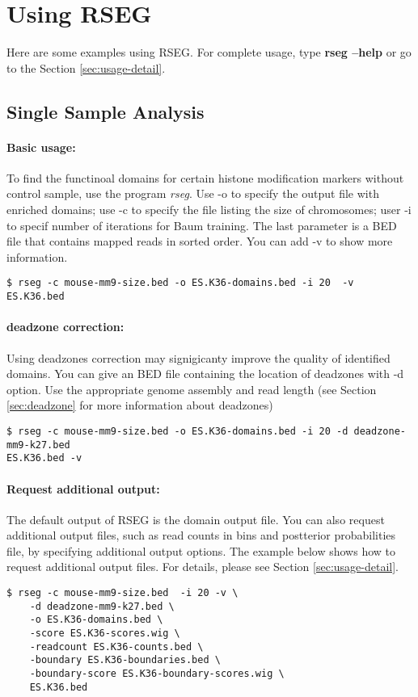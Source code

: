 \documentclass[11pt]{report}
\begin{document}
\section{Using RSEG}
\label{sec:usage}

Here are some examples using RSEG. For complete usage, type \textbf{rseg
 --help} or go to the Section \ref{sec:usage-detail}.

\subsection{Single Sample Analysis}
\label{sec:use-rseg}

\paragraph{Basic usage:} 
To find the functinoal domains for certain histone modification markers without
control sample, use the program \textit{rseg}. Use -o to specify the output file
with enriched domains; use -c to specify the file listing the size of
chromosomes; user -i to specif number of iterations for Baum training. The last
parameter is a BED file that contains mapped reads in sorted order. You can add
-v to show more information.
\begin{verbatim}
$ rseg -c mouse-mm9-size.bed -o ES.K36-domains.bed -i 20  -v  ES.K36.bed
\end{verbatim}

\paragraph{deadzone correction:}
Using deadzones correction may signigicanty improve the quality of
identified domains. You can give an BED file containing the location
of deadzones with -d option. Use the appropriate genome assembly and
read length (see Section \ref{sec:deadzone} for more information about
deadzones)
\begin{verbatim}
$ rseg -c mouse-mm9-size.bed -o ES.K36-domains.bed -i 20 -d deadzone-mm9-k27.bed 
ES.K36.bed -v
\end{verbatim}

\paragraph{Request additional output:}
The default output of RSEG is the domain output file. You can also request
additional output files, such as read counts in bins and postterior
probabilities file, by specifying additional output options. The example below
shows how to request additional output files. For details, please see Section
\ref{sec:usage-detail}.
\begin{verbatim}
$ rseg -c mouse-mm9-size.bed  -i 20 -v \
    -d deadzone-mm9-k27.bed \
    -o ES.K36-domains.bed \
    -score ES.K36-scores.wig \
    -readcount ES.K36-counts.bed \
    -boundary ES.K36-boundaries.bed \
    -boundary-score ES.K36-boundary-scores.wig \
    ES.K36.bed
\end{verbatim}
\end{document}
